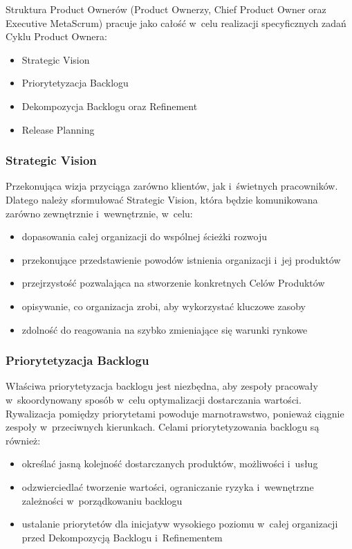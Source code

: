 \documentclass[12pt,a4paper,parskip=full]{scrartcl}
\begin{document}
Struktura Product Ownerów (Product Ownerzy, Chief Product Owner oraz Executive MetaScrum) pracuje jako całość w~celu realizacji specyficznych zadań Cyklu Product Ownera:

\begin{itemize}
\itemsep1pt\parskip0pt
\item
  Strategic Vision
\item
  Priorytetyzacja Backlogu
\item
  Dekompozycja Backlogu oraz Refinement
\item
  Release Planning
\end{itemize}

\subsubsection{Strategic Vision}\label{strategic-vision}

Przekonująca wizja przyciąga zarówno klientów, jak i~świetnych pracowników. Dlatego należy sformułować Strategic Vision, która będzie komunikowana zarówno zewnętrznie i~wewnętrznie, w~celu:

\begin{itemize}
\itemsep1pt\parskip0pt
\item
  dopasowania całej organizacji do wspólnej ścieżki rozwoju
\item
  przekonujące przedstawienie powodów istnienia organizacji i~jej produktów
\item
  przejrzystość pozwalająca na stworzenie konkretnych Celów Produktów
\item
  opisywanie, co organizacja zrobi, aby wykorzystać kluczowe zasoby
\item
  zdolność do reagowania na szybko zmieniające się warunki rynkowe
\end{itemize}

\subsubsection{Priorytetyzacja Backlogu}\label{backlog-prioritization}

Właściwa priorytetyzacja backlogu jest niezbędna, aby zespoły pracowały w~skoordynowany sposób w~celu optymalizacji dostarczania wartości. Rywalizacja pomiędzy priorytetami powoduje marnotrawstwo, ponieważ ciągnie zespoły w~przeciwnych kierunkach. Celami priorytetyzowania backlogu są również:

\begin{itemize}
\itemsep1pt\parskip0pt
\item
  określać jasną kolejność dostarczanych produktów, możliwości i~usług
\item
  odzwierciedlać tworzenie wartości, ograniczanie ryzyka i~wewnętrzne zależności w~porządkowaniu backlogu
\item
  ustalanie priorytetów dla inicjatyw wysokiego poziomu w~całej organizacji przed Dekompozycją Backlogu i~Refinementem 
\end{itemize}
\end{document}
